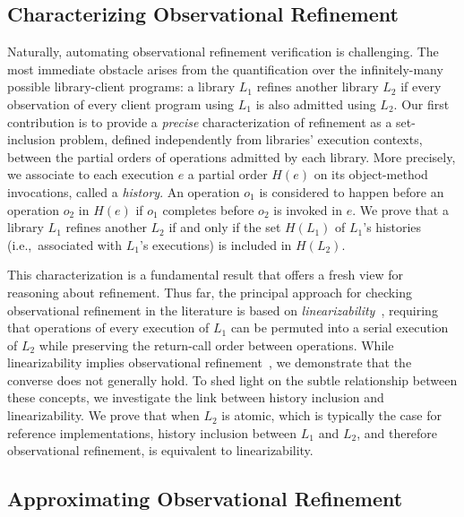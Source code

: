 \subsection{Characterizing Observational Refinement}
\label{sec:intro:histories}

Naturally, automating observational refinement verification is challenging. The
most immediate obstacle arises from the quantification over the infinitely-many
possible library-client programs: a library $L_1$ refines another library $L_2$
if every observation of every client program using $L_1$ is also admitted using
$L_2$. Our first contribution is to provide a \emph{precise} characterization
of refinement as a set-inclusion problem, defined independently from libraries'
execution contexts, between the partial orders of operations admitted by each
library. More precisely, we associate to each execution $e$ a partial order
$H(e)$ on its object-method invocations, called a \emph{history}. An operation
$o_1$ is considered to happen before an operation $o_2$ in $H(e)$ if $o_1$
completes before $o_2$ is invoked in $e$. We prove that a library $L_1$ refines
another $L_2$ if and only if the set $H(L_1)$ of $L_1$'s histories
(i.e.,~associated with $L_1$'s executions) is included in $H(L_2)$.

This characterization is a fundamental result that offers a fresh view for
reasoning about refinement. Thus far, the principal approach for checking
observational refinement in the literature is based on
\emph{linearizability}~\cite{journals/toplas/HerlihyW90}, requiring that
operations of every execution of $L_1$ can be permuted into a serial execution
of $L_2$ while preserving the return-call order between operations. While
linearizability implies observational
refinement~\cite{journals/tcs/FilipovicORY10}, we demonstrate that the converse
does not generally hold. To shed light on the subtle relationship between these
concepts, we investigate the link between history inclusion and
linearizability. We prove that when $L_2$ is atomic, which is typically the
case for reference implementations, history inclusion between $L_1$ and
$L_2$, and therefore observational refinement, is equivalent to linearizability.


\subsection{Approximating Observational Refinement}
\label{sec:intro:approx}

